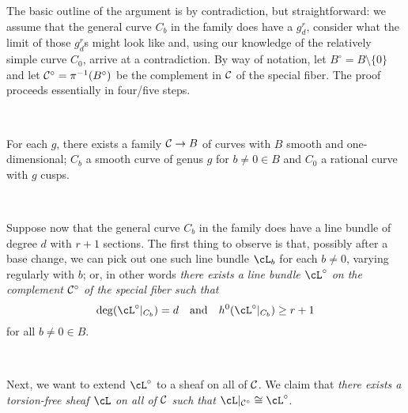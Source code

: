 The basic outline of the argument is by contradiction, but straightforward: we assume that the general curve $C_b$ in the family does have a $g^r_d$, consider what the limit of those $g^r_d$s might look like and, using our knowledge of the relatively simple curve $C_0$, arrive at a contradiction. By way of notation, let $B^\circ = B \setminus \{0\}$ and let $\cC^\circ = \pi^{-1}(B^\circ)$ be the complement in $\cC$ of the special fiber. The proof proceeds essentially in four/five steps.

\


\begin{lemma}\label{cusp smoothing lemma}
For each $g$, there exists a family $\cC \to B$ of curves with $B$ smooth and one-dimensional; $C_b$ a smooth curve of genus $g$ for $b \neq 0 \in B$ and $C_0$ a rational curve with $g$ cusps.
\end{lemma}

\


Suppose now that the general curve $C_b$ in the family does have a line bundle  of degree $d$ with $r+1$ sections. The first thing to observe is that, possibly after a base change, we can pick out one such line bundle $\cL_b$ for each $b \neq 0$, varying regularly with $b$; or, in other words \emph{there exists a  line bundle $\cL^\circ$ on the complement $\cC^\circ$ of the special fiber such that}
$$
\deg(\cL^\circ|_{C_b}) = d \quad \text{and} \quad h^0(\cL^\circ|_{C_b}) \geq r+1
$$
for all $b \neq 0 \in B$. 

\


Next, we want to extend $\cL^\circ$ to a sheaf on all of $\cC$. We claim that \emph{there exists a torsion-free sheaf $\cL$ on all of $\cC$ such that $\cL|_{\cC^\circ} \cong \cL^\circ$}.

